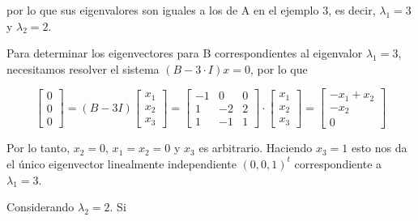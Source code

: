 \documentclass{report}
\numberwithin{subsection}{section} %
\begin{document}
    por lo que sus eigenvalores son iguales a los de A en el ejemplo 3, es decir, $\lambda_1 = 3$ y $\lambda_2 = 2$.
    
    Para determinar los eigenvectores para B correspondientes al eigenvalor $\lambda_1 = 3$, necesitamos
    resolver el sistema $(B - 3\cdot I)x = 0$, por lo que

    \begin{equation*}
        \begin{bmatrix}
            0 \\ 0 \\ 0
        \end{bmatrix} = (B - 3I)
        \begin{bmatrix}
            x_1 \\ x_2 \\ x_3
        \end{bmatrix} =
        \begin{bmatrix}
            -1 & 0 & 0 \\
            1 & -2 & 2 \\
            1 & -1 & 1
        \end{bmatrix}  \cdot 
        \begin{bmatrix}
            x_1 \\ x_2 \\ x_3
        \end{bmatrix} =
        \begin{bmatrix}
            -x_1 + x_2 \\ -x_2 \\ 0
        \end{bmatrix}
    \end{equation*}

    Por lo tanto, $x_2 = 0$, $x_1 = x_2 = 0$ y $x_3$ es arbitrario. Haciendo $x_3 = 1$ esto nos da el único eigenvector linealmente independiente $(0, 0, 1)^t$ correspondiente a $\lambda_1 = 3$.

    Considerando $\lambda_2 = 2$. Si
\end{document}

